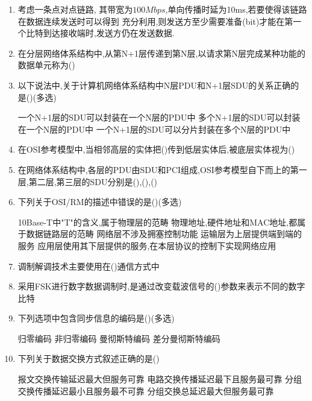 \documentclass[12pt, a4paper, oneside, UTF8]{ctexbook}
\begin{document}
\begin{enumerate}
    \item 考虑一条点对点链路, 其带宽为$100Mbps$,单向传播时延为10ms,若要使得该链路在数据连续发送时可以得到
    充分利用,则发送方至少需要准备(\qquad bit)才能在第一个比特到达接收端时,发送方仍在发送数据.

    \item 在分层网络体系结构中,从第N+1层传递到第N层,以请求第N层完成某种功能的数据单元称为(\qquad)
    \item 以下说法中,关于计算机网络体系结构中N层PDU和N+1层SDU的关系正确的是(\qquad)(多选)
    \begin{choices}[1]
        \task 一个N+1层的SDU可以封装在一个N层的PDU中
        \task 多个N+1层的SDU可以封装在一个N层的PDU中
        \task 一个N+1层的SDU可以分片封装在多个N层的PDU中
    \end{choices}
    \item 在OSI参考模型中,当相邻高层的实体把(\qquad)传到低层实体后,被底层实体视为(\qquad) 
    \item 在网络体系结构中,各层的PDU由SDU和PCI组成,OSI参考模型自下而上的第一层,第二层,第三层的SDU分别是(\qquad),(\qquad),(\qquad)
    \item 下列关于OSI/RM的描述中错误的是(\qquad)(多选)
    \begin{choices}[1]
        \task 10Base-T中"T"的含义,属于物理层的范畴
        \task 物理地址,硬件地址和MAC地址,都属于数据链路层的范畴
        \task 网络层不涉及拥塞控制功能
        \task 运输层为上层提供端到端的服务
        \task 应用层使用其下层提供的服务,在本层协议的控制下实现网络应用
    \end{choices}
    \item 调制解调技术主要使用在(\qquad)通信方式中
    \item 采用FSK进行数字数据调制时,是通过改变载波信号的(\qquad)参数来表示不同的数字比特
    \item 下列选项中包含同步信息的编码是(\qquad)(多选)
    \begin{choices}
        \task 归零编码
        \task 非归零编码
        \task 曼彻斯特编码
        \task 差分曼彻斯特编码
    \end{choices}
    \item 下列关于数据交换方式叙述正确的是(\qquad)
    \begin{choices}[1]
        \task 报文交换传输延迟最大但服务可靠
        \task 电路交换传播延迟最下且服务最可靠
        \task 分组交换传播延迟最小且服务最不可靠
        \task 分组交换总延迟最大但服务最可靠
    \end{choices}


\end{enumerate}
\end{document}
